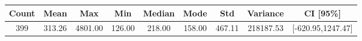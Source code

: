 \begin{tabular}{|c|c|c|c|c|c|c|c|c|}\hline
\rowcolor{Plum!20}
Count&Mean&Max&Min&Median&Mode&Std&Variance&CI [95\%]\\\hline\hline
399&313.26&4801.00&126.00&218.00&158.00&467.11&218187.53&[-620.95,1247.47]\\\hline
\end{tabular}

